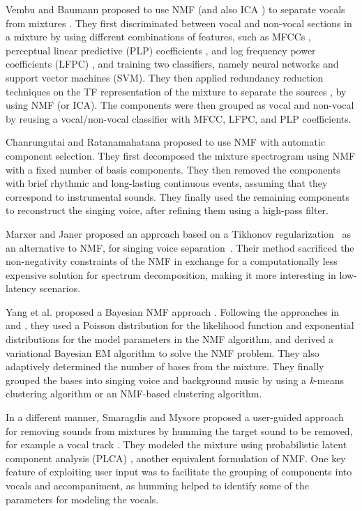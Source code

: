 Vembu and Baumann proposed to use NMF (and also ICA \cite{common94}) to separate vocals from mixtures \cite{vembu05}. They first discriminated between vocal and non-vocal sections in a mixture by using different combinations of features, such as MFCCs \cite{david80}, perceptual linear predictive (PLP) coefficients \cite{hermansky90}, and log frequency power coefficients (LFPC) \cite{nwe04}, and training two classifiers, namely neural networks and support vector machines (SVM). They then applied redundancy reduction techniques on the TF representation of the mixture to separate the sources \cite{casey00}, by using NMF (or ICA). The components were then grouped as vocal and non-vocal by reusing a vocal/non-vocal classifier with MFCC, LFPC, and PLP coefficients.

Chanrungutai and Ratanamahatana proposed to use NMF with automatic component selection\cite{chanrungutai08}. They first decomposed the mixture spectrogram using NMF with a fixed number of basis components. They then removed the components with brief rhythmic and long-lasting continuous events, assuming that they correspond to instrumental sounds. They finally used the remaining components to reconstruct the singing voice, after refining them using a high-pass filter.

Marxer and Janer proposed an approach based on a Tikhonov regularization~\cite{tikhonov63} as an alternative to NMF, for singing voice separation~\cite{marxer122}. Their method sacrificed the non-negativity constraints of the NMF in exchange for a computationally less expensive solution for spectrum decomposition, making it more interesting in low-latency scenarios.

Yang et al. proposed a Bayesian NMF approach \cite{yang14,chien15}. Following the approaches in \cite{cemgil09} and \cite{schmidt09}, they used a Poisson distribution for the likelihood function and exponential distributions for the model parameters in the NMF algorithm, and derived a variational Bayesian EM  algorithm \cite{dempster77} to solve the NMF problem. They also adaptively determined the number of bases from the mixture. They finally grouped the bases into singing voice and background music by using a \textit{k}-means clustering algorithm \cite{spiertz09} or an NMF-based clustering algorithm.

In a different manner, Smaragdis and Mysore proposed a user-guided approach for removing sounds from mixtures by humming the target sound to be removed, for example a vocal track \cite{smaragdis09}. They modeled the mixture using probabilistic latent component analysis (PLCA) \cite{smaragdis07}, another equivalent formulation of NMF. One key feature of exploiting user input was to facilitate the grouping of components into vocals and accompaniment, as humming helped to identify some of the parameters for modeling the vocals.


